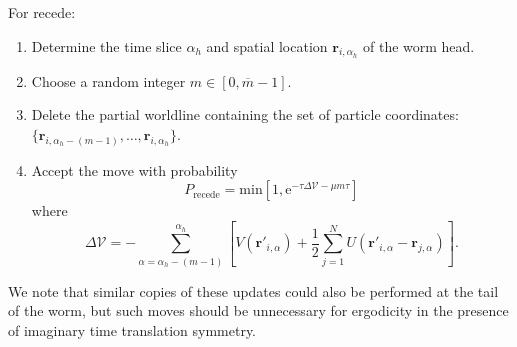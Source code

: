 \documentclass[prb,aps,amssym,nofootinbib,floatfix,notitlepage]{revtex4-1}
\renewcommand{\vec}[1]{\boldsymbol{#1}}
\newcommand{\e}[1]{\mathrm{e}^{#1}}
\begin{document}
\noindent
For recede:
\begin{enumerate}
    \item Determine the time slice $\alpha_h$ and spatial location
        $\vec{r}_{i,\alpha_h}$ of the worm head.
    \item Choose a random integer $m \in [0,\overline{m}-1]$.
    \item Delete the partial worldline containing the set of particle coordinates: 
        $\{\vec{r}_{i,\alpha_h-(m-1)},\ldots, \vec{r}_{i,\alpha_h}\}$.
\item Accept the move with probability
\begin{equation}
    P_{\text{recede}} = \mathrm{min} \left[1,
    \e{-\tau \Delta \mathcal{V} - \mu m \tau} \right]
\end{equation}
%
where
%
\begin{equation}
    \Delta\mathcal{V} = -\sum_{\alpha=\alpha_h-(m-1)}^{\alpha_h} \left[ 
        V(\vec{r}'_{i,\alpha}) + \frac{1}{2}\sum_{j=1}^N
        U(\vec{r}'_{i,\alpha}-\vec{r}_{j,\alpha}) \right].
\end{equation}
%
\end{enumerate}
We note that similar copies of these updates could also be performed at the
tail of the worm, but such moves should be unnecessary for ergodicity in the presence of
imaginary time translation symmetry.
\end{document}
